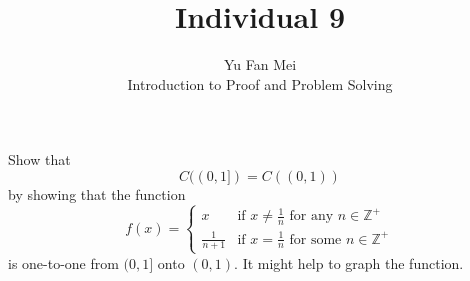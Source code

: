 \documentclass[12pt]{article}
\newenvironment{problem}[2][Problem]{\begin{trivlist}
\item[\hskip \labelsep {\bfseries #1}\hskip \labelsep {\bfseries #2.}]}{\end{trivlist}}
\begin{document}

\title{Individual 9}%
\author{Yu Fan Mei\\
	Introduction to Proof and Problem Solving} %

\maketitle

\begin{problem}{1}
    Show that  
\[
C((0, 1]) = C((0, 1))
\]  
by showing that the function  
\[
f(x) = 
\begin{cases} 
x & \text{if } x \neq \frac{1}{n} \text{ for any } n \in \mathbb{Z}^+ \\
\frac{1}{n+1} & \text{if } x = \frac{1}{n} \text{ for some } n \in \mathbb{Z}^+
\end{cases}
\]
is one-to-one from \((0, 1]\) onto \((0, 1)\). It might help to graph the function.
\end{problem}
\end{document}
